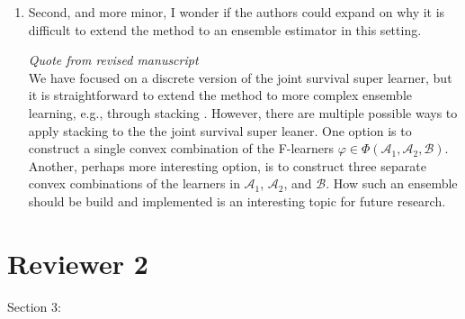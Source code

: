 \documentclass[a4paper,danish]{article}
\renewcommand{\phi}{\varphi}
\newcommand{\1}{\mathds{1}}
\newcommand{\qrev}[2]{
\vspace{.5em}
\begin{tcolorbox}[boxrule=0pt]
\hfill{\it\footnotesize Quote from revised manuscript#1}\\[.5em]
#2
\end{tcolorbox}
}
\newcommand{\answer}[1]{{\vspace{1em}{\bf #1}\vspace{1em}}}
\begin{document}
\begin{enumerate}
\item Second, and more minor, I wonder if the authors could expand on why
it is difficult to extend the method to an ensemble estimator in
this setting.

\answer{Thank you for this comment. We do not believe that it needs to
  be particularly difficult, but it is beyond the scope of our manuscript.
  We have now rephrased and expanded this paragraph
  in the discussion.
  }
\qrev{}{
We have focused on a discrete version of the joint survival super
learner, but it is straightforward to extend the method to more complex
ensemble learning, e.g., through
stacking \citep{breiman1996stacked}. However, there are multiple possible ways 
to apply stacking to the the joint survival super leaner. One option is
to construct a single convex combination of the F-learners
\( \phi \in \Phi(\mathcal{A}_1, \mathcal{A}_2, \mathcal{B})
\). Another, perhaps more interesting option, is to construct
three separate convex combinations of the learners in
\( \mathcal{A}_1 \), \( \mathcal{A}_2 \), and \( \mathcal{B} \).  How
such an ensemble should be build and implemented is an interesting
topic for future research.
}
\end{enumerate}





\section*{Reviewer 2}
\label{sec:orgd8b23d8}

Section 3:
\end{document}
